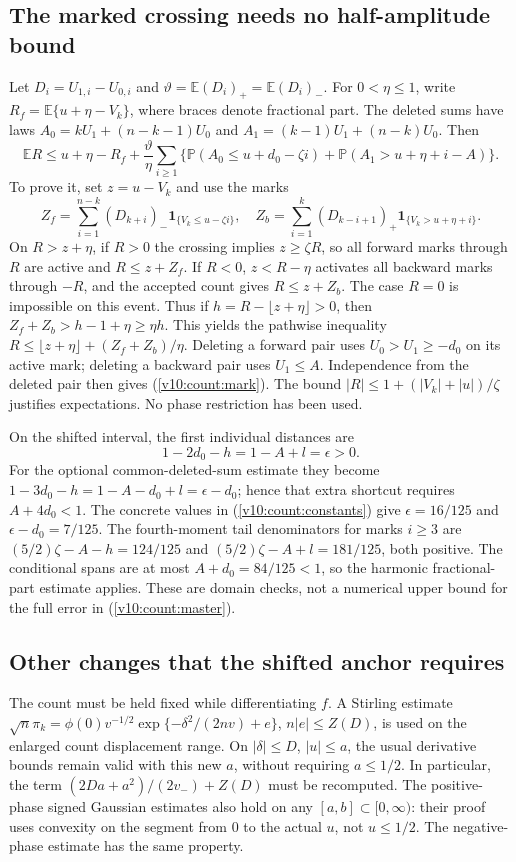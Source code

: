 \subsection{The marked crossing needs no half-amplitude bound}
Let $D_i=U_{1,i}-U_{0,i}$ and
$\vartheta=\mathbb E(D_i)_+=\mathbb E(D_i)_-$. For $0<\eta\le1$,
write $R_f=\mathbb E\{u+\eta-V_k\}$, where braces denote fractional part.
The deleted sums have laws
$A_0=kU_1+(n-k-1)U_0$ and $A_1=(k-1)U_1+(n-k)U_0$. Then
\begin{equation}\label{v10:count:mark}
 \mathbb ER\le u+\eta-R_f+\frac{\vartheta}{\eta}
 \sum_{i\ge1}\{\mathbb P(A_0\le u+d_0-\zeta i)
                  +\mathbb P(A_1>u+\eta+i-A)\}.
\end{equation}
To prove it, set $z=u-V_k$ and use the marks
\[
 Z_f=\sum_{i=1}^{n-k}(D_{k+i})_-\mathbf1_{\{V_k\le u-\zeta i\}},
 \quad Z_b=\sum_{i=1}^{k}(D_{k-i+1})_+
                         \mathbf1_{\{V_k>u+\eta+i\}}.
\]
On $R>z+\eta$, if $R>0$ the crossing implies $z\ge\zeta R$, so all
forward marks through $R$ are active and $R\le z+Z_f$. If $R<0$,
$z<R-\eta$ activates all backward marks through $-R$, and the accepted
count gives $R\le z+Z_b$. The case $R=0$ is impossible on this event.
Thus if $h=R-\lfloor z+\eta\rfloor>0$, then
$Z_f+Z_b>h-1+\eta\ge\eta h$. This yields the pathwise inequality
$R\le\lfloor z+\eta\rfloor+(Z_f+Z_b)/\eta$.
Deleting a forward pair uses $U_0>U_1\ge-d_0$ on its active mark;
deleting a backward pair uses $U_1\le A$. Independence from the deleted
pair then gives (\ref{v10:count:mark}). The bound
$|R|\le1+(|V_k|+|u|)/\zeta$ justifies expectations. No phase restriction
has been used.

On the shifted interval, the first individual distances are
\[
 1-2d_0-h=1-A+l=\epsilon>0.
\]
For the optional common-deleted-sum estimate they become
$1-3d_0-h=1-A-d_0+l=\epsilon-d_0$; hence that extra shortcut requires
$A+4d_0<1$. The concrete values in (\ref{v10:count:constants}) give
$\epsilon=16/125$ and $\epsilon-d_0=7/125$.
The fourth-moment tail denominators for marks $i\ge3$ are
$(5/2)\zeta-A-h=124/125$ and $(5/2)\zeta-A+l=181/125$, both positive.
The conditional spans are at most $A+d_0=84/125<1$, so the harmonic
fractional-part estimate applies. These are domain checks, not a numerical
upper bound for the full error in (\ref{v10:count:master}).

\subsection{Other changes that the shifted anchor requires}
The count must be held fixed while differentiating $f$. A Stirling estimate
$\sqrt n\pi_k=\phi(0)v^{-1/2}\exp\{-\delta^2/(2nv)+e\}$,
$n|e|\le Z(D)$, is used on the enlarged count displacement range.
On $|\delta|\le D$, $|u|\le a$, the usual derivative bounds remain valid
with this new $a$, without requiring $a\le1/2$. In particular, the term
$(2Da+a^2)/(2v_-)+Z(D)$ must be recomputed. The positive-phase signed
Gaussian estimates also hold on any $[a,b]\subset[0,\infty)$: their proof
uses convexity on the segment from $0$ to the actual $u$, not $u\le1/2$.
The negative-phase estimate has the same property.

